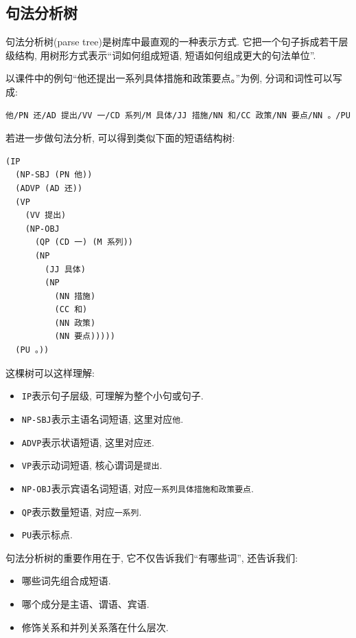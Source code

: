 \subsection{句法分析树}


句法分析树(parse tree)是树库中最直观的一种表示方式.
它把一个句子拆成若干层级结构, 用树形方式表示“词如何组成短语, 短语如何组成更大的句法单位”.

以课件中的例句“他还提出一系列具体措施和政策要点。”为例,
分词和词性可以写成:

\begin{Verbatim}[breaklines=true,breakanywhere=true,fontsize=\small]
他/PN 还/AD 提出/VV 一/CD 系列/M 具体/JJ 措施/NN 和/CC 政策/NN 要点/NN 。/PU
\end{Verbatim}

若进一步做句法分析, 可以得到类似下面的短语结构树:

\begin{Verbatim}[breaklines=true,breakanywhere=true,fontsize=\small]
(IP
  (NP-SBJ (PN 他))
  (ADVP (AD 还))
  (VP
    (VV 提出)
    (NP-OBJ
      (QP (CD 一) (M 系列))
      (NP
        (JJ 具体)
        (NP
          (NN 措施)
          (CC 和)
          (NN 政策)
          (NN 要点)))))
  (PU 。))
\end{Verbatim}

这棵树可以这样理解:

\begin{itemize}
\item \texttt{IP}表示句子层级, 可理解为整个小句或句子.
\item \texttt{NP-SBJ}表示主语名词短语, 这里对应\texttt{他}.
\item \texttt{ADVP}表示状语短语, 这里对应\texttt{还}.
\item \texttt{VP}表示动词短语, 核心谓词是\texttt{提出}.
\item \texttt{NP-OBJ}表示宾语名词短语, 对应\texttt{一系列具体措施和政策要点}.
\item \texttt{QP}表示数量短语, 对应\texttt{一系列}.
\item \texttt{PU}表示标点.
\end{itemize}

句法分析树的重要作用在于, 它不仅告诉我们“有哪些词”, 还告诉我们:

\begin{itemize}
\item 哪些词先组合成短语.
\item 哪个成分是主语、谓语、宾语.
\item 修饰关系和并列关系落在什么层次.
\end{itemize}

